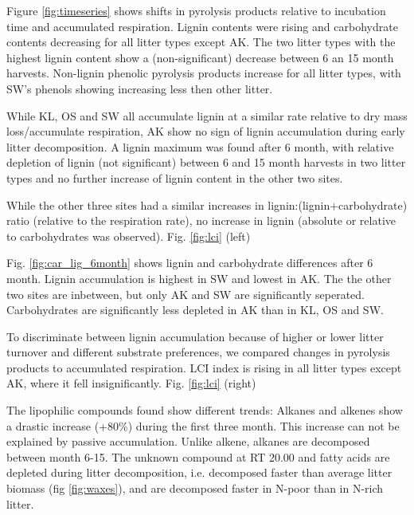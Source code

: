 Figure \ref{fig:timeseries} shows shifts in pyrolysis products relative to incubation time and accumulated respiration. Lignin contents were rising and carbohydrate contents decreasing for all litter types except AK. The two litter types with the highest lignin content show a (non-significant) decrease between 6 an 15 month harvests. Non-lignin phenolic pyrolysis products increase for all litter types, with SW's phenols showing increasing less then other litter.

While KL, OS and SW all accumulate lignin at a similar rate relative to dry mass loss/accumulate respiration, AK show no sign of lignin accumulation during early litter decomposition. A lignin maximum was found after 6 month, with relative depletion of lignin (not significant) between 6 and 15 month harvests in two litter types and no further increase of lignin content in the other two sites. 

While the other three sites had a similar increases in lignin:(lignin+carbohydrate) ratio (relative to the respiration rate), no increase in lignin (absolute or relative to carbohydrates was observed). Fig. \ref{fig:lci} (left)

Fig. \ref{fig:car_lig_6month} shows lignin and carbohydrate differences after 6 month. Lignin accumulation is highest in SW and lowest in AK. The the other two sites are inbetween, but only AK and SW are significantly seperated. Carbohydrates are significantly less depleted in AK than in KL, OS and SW. 

To discriminate between lignin accumulation because of higher or lower litter turnover and different substrate preferences, we compared changes in pyrolysis products to accumulated respiration. LCI index is rising in all litter types except AK, where it fell insignificantly.
Fig. \ref{fig:lci} (right)

The lipophilic compounds found show different trends: Alkanes and alkenes show a drastic increase (+80\%) during the first three month. This increase can not be explained by passive accumulation. Unlike alkene, alkanes are decomposed between month 6-15. The unknown compound at RT 20.00 and fatty acids are depleted during litter decomposition, i.e. decomposed faster than average litter biomass (fig \ref{fig:waxes}), and are decomposed faster in N-poor than in N-rich litter. 





